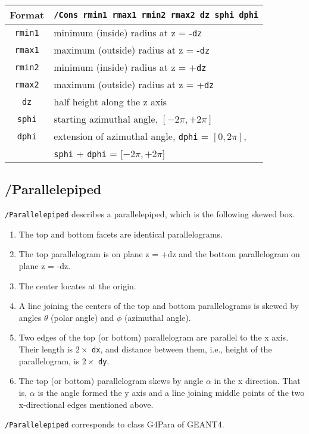 \begin{tabular}{|c|l|}
\hline%
Format & \verb+/Cons rmin1 rmax1 rmin2 rmax2 dz sphi dphi+\\
\hline%
\verb+rmin1+  & minimum (inside) radius at z = -\verb+dz+\\
\hline%
\verb+rmax1+  & maximum (outside) radius at z = -\verb+dz+\\
\hline%
\verb+rmin2+  & minimum (inside)  radius at z = +\verb+dz+\\
\hline%
\verb+rmax2+  & maximum (outside) radius at z = +\verb+dz+\\
\hline%
\verb+dz+     & half height along the z axis\\
\hline%
\verb+sphi+  &  starting azimuthal angle, $[-2\pi, +2\pi]$ \\
\hline%
\verb+dphi+  &  extension of azimuthal angle, \verb+dphi+ = $[0, 2\pi]$, \\
             &  \verb+sphi+ + \verb+dphi+ = $[-2\pi, +2\pi$] \\
\hline%
\end{tabular}


\subsection{/Parallelepiped}  
\verb+/Parallelepiped+ describes a parallelepiped,  
which is the following skewed box.
\begin{enumerate}
\item The top and bottom facets are identical parallelograms.
\item The top parallelogram is on plane     z = +dz  
      and the bottom parallelogram on plane z = -dz.
\item The center locates at the origin.
\item A line joining the centers of the top and bottom parallelograms is
      skewed by angles $\theta$ (polar angle) and $\phi$ (azimuthal angle).
\item Two edges of the top (or bottom) parallelogram are parallel  
      to the x axis.   
      Their length is $2\times$ \verb+dx+, and
      distance between them, i.e., height of the parallelogram,  
      is $2\times$ \verb+dy+.
\item The top (or bottom) parallelogram skews by angle $\alpha$ in the   
      x direction.
      That is, $\alpha$ is the angle formed the y axis and
      a line joining middle points of the two x-directional edges   
      mentioned above.
\end{enumerate}
\verb+/Parallelepiped+ corresponds to class G4Para of GEANT4.
\vspace{.20in}


